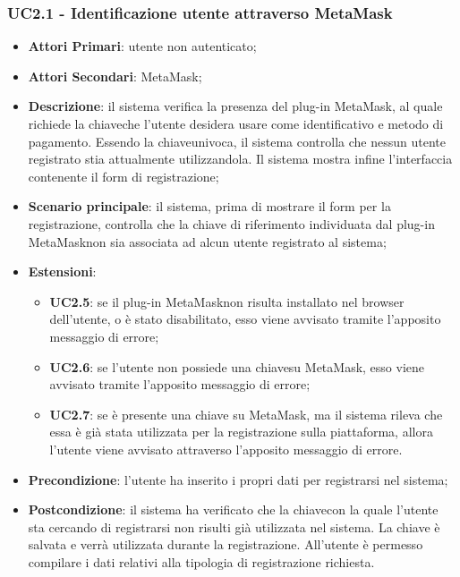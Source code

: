 \subsubsection{UC2.1 - Identificazione utente attraverso MetaMask}
\begin{itemize}
	\item \textbf{Attori Primari}: utente non autenticato;
	\item \textbf{Attori Secondari}: MetaMask\glo;
	\item \textbf{Descrizione}: il sistema verifica la presenza del plug-in MetaMask\glo, al quale richiede la chiave\glosp che l'utente desidera usare come identificativo e metodo di pagamento. Essendo la chiave\glosp univoca, il sistema controlla che nessun utente registrato stia attualmente utilizzandola. Il sistema mostra infine l'interfaccia contenente il form di registrazione;
	\item \textbf{Scenario principale}: il sistema, prima di mostrare il form per la registrazione, controlla che la chiave di riferimento individuata dal plug-in MetaMask\glosp non sia associata ad alcun utente registrato al sistema;
	\item \textbf{Estensioni}:
	\begin{itemize}
		\item \textbf{UC2.5}: se il plug-in MetaMask\glosp non risulta installato nel browser dell'utente, o è stato disabilitato, esso viene avvisato tramite l'apposito messaggio di errore;
		\item \textbf{UC2.6}: se l'utente non possiede una chiave\glosp su MetaMask\glo, esso viene avvisato tramite l'apposito messaggio di errore;
		\item \textbf{UC2.7}: se è presente una chiave su MetaMask\glo, ma il sistema rileva che essa è già stata utilizzata per la registrazione sulla piattaforma, allora l'utente viene avvisato attraverso l'apposito messaggio di errore.
	\end{itemize}
	\item \textbf{Precondizione}: l'utente ha inserito i propri dati per registrarsi nel sistema;
	\item \textbf{Postcondizione}: il sistema ha verificato che la chiave\glosp con la quale l'utente sta cercando di registrarsi non risulti già utilizzata nel sistema. La chiave è salvata e verrà utilizzata durante la registrazione. All'utente è permesso compilare i dati relativi alla tipologia di registrazione richiesta.
	
\end{itemize}
